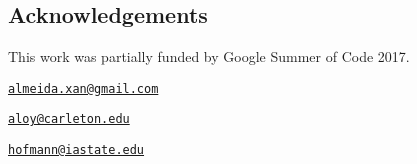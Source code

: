 

\subsection{Acknowledgements}\label{acknowledgements}

This work was partially funded by Google Summer of Code 2017.

\address{%
Alexandre Almeida\\
University of Campinas\\
Institute of Computing\\ Campinas, Brazil 13083-852\\
}
\href{mailto:almeida.xan@gmail.com}{\nolinkurl{almeida.xan@gmail.com}}

\address{%
Adam Loy\\
Carleton College\\
Department of Mathematics and Statistics\\ Northfield, MN 55057\\
}
\href{mailto:aloy@carleton.edu}{\nolinkurl{aloy@carleton.edu}}

\address{%
Heike Hofmann\\
Iowa State University\\
Department of Statistics\\ Ames, IA 50011-1210\\
}
\href{mailto:hofmann@iastate.edu}{\nolinkurl{hofmann@iastate.edu}}

